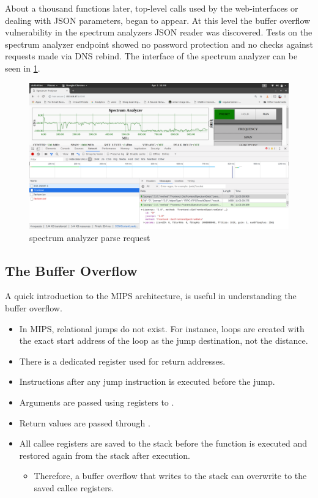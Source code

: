 About a thousand functions later, top-level calls used by the web-interfaces or dealing with JSON parameters, began to appear.
At this level the buffer overflow vulnerability in the spectrum analyzers JSON reader was discovered.
Tests on the spectrum analyzer endpoint showed no password protection and no checks against requests made via DNS rebind.
The interface of the spectrum analyzer can be seen in \cref{fig:spectrumAnalyserInterface}.

\begin{figure}
  \includegraphics[width=1\textwidth]{graphics/spectrumAnalyserInterface}
  \caption{spectrum analyzer parse request}
  \label{fig:spectrumAnalyserInterface}
\end{figure}

\subsection{The Buffer Overflow}
A quick introduction to the MIPS architecture, is useful in understanding the buffer overflow.
\begin{itemize}
  \item In MIPS, relational jumps do not exist. For instance, loops are created with the exact start address of the loop as the jump destination, not the distance.
  \item There is a dedicated  register used for return addresses.
  \item Instructions after any jump instruction is executed before the jump.
  \item Arguments are passed using registers  to .
  \item Return values are passed through .
  \item All callee registers are saved to the stack before the function is executed and restored again from the stack after execution.
  \begin{itemize}
    \item Therefore, a buffer overflow that writes to the stack can overwrite to the saved callee registers.
  \end{itemize}
\end{itemize}

